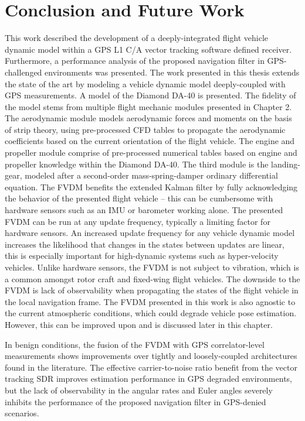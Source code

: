 \chapter{Conclusion and Future Work}
This work described the development of a deeply-integrated flight vehicle dynamic model within a GPS L1 C/A vector tracking software defined receiver. Furthermore, a performance analysis of the proposed navigation filter in GPS-challenged environments was presented. The work presented in this thesis extends the state of the art by modeling a vehicle dynamic model deeply-coupled with GPS measurements. A model of the Diamond DA-40 is presented. The fidelity of the model stems from multiple flight mechanic modules presented in Chapter 2. The aerodynamic module models aerodynamic forces and moments on the basis of strip theory, using pre-processed CFD tables to propagate the aerodynamic coefficients based on the current orientation of the flight vehicle. The engine and propeller module comprise of pre-processed numerical tables based on engine and propeller knowledge within the Diamond DA-40. The third module is the landing-gear, modeled after a second-order mass-spring-damper ordinary differential equation. The FVDM benefits the extended Kalman filter by fully acknowledging the behavior of the presented flight vehicle {--} this can be cumbersome with hardware sensors such as an IMU or barometer working alone. The presented FVDM can be run at any update frequency, typically a limiting factor for hardware sensors. An increased update frequency for any vehicle dynamic model increases the likelihood that changes in the states between updates are linear, this is especially important for high-dynamic systems such as hyper-velocity vehicles. Unlike hardware sensors, the FVDM is not subject to vibration, which is a common amongst rotor craft and fixed-wing flight vehicles. The downside to the FVDM is lack of observability when propagating the states of the flight vehicle in the local navigation frame. The FVDM presented in this work is also agnostic to the current atmospheric conditions, which could degrade vehicle pose estimation. However, this can be improved upon and is discussed later in this chapter.

In benign conditions, the fusion of the FVDM with GPS correlator-level measurements shows improvements over tightly and loosely-coupled architectures found in the literature. The effective carrier-to-noise ratio benefit from the vector tracking SDR improves estimation performance in GPS degraded environments, but the lack of observability in the angular rates and Euler angles severely inhibits the performance of the proposed navigation filter in GPS-denied scenarios.
